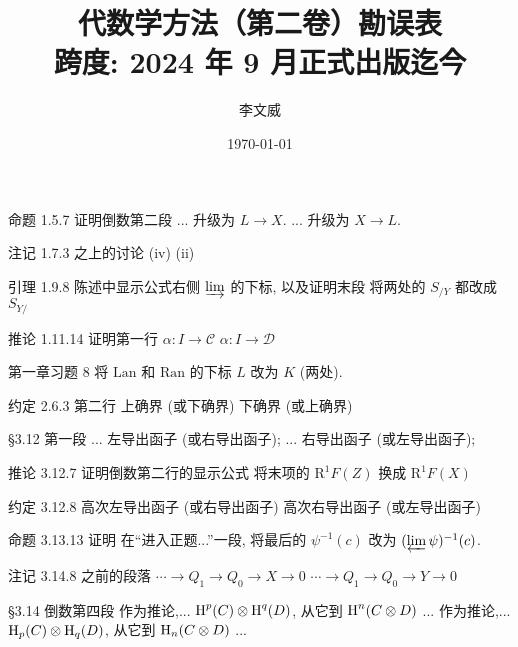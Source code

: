 \documentclass{AJerrata}
\title{\bfseries 代数学方法（第二卷）勘误表 \\ 跨度: 2024 年 9 月正式出版迄今 }
\author{李文威}
\date{\today}
\begin{document}
	\maketitle

	\begin{Errata}
		\item[命题 1.5.7 证明倒数第二段]
		\Orig ... 升级为 $L \to X$.
		\Corr ... 升级为 $X \to L$.
		
		\item[注记 1.7.3 之上的讨论]
		\Orig (iv)
		\Corr (ii)
		
		\item[引理 1.9.8 陈述中显示公式右侧 $\varinjlim$ 的下标, 以及证明末段]
		将两处的 $S_{/Y}$ 都改成 $S_{Y/}$
		
		\item[推论 1.11.14 证明第一行]
		\Orig $\alpha: I \to \mathcal{C}$
		\Corr $\alpha: I \to \mathcal{D}$
		
		\item[第一章习题 8]
		将 $\mathrm{Lan}$ 和 $\mathrm{Ran}$ 的下标 $L$ 改为 $K$ (两处).
		
		\item[约定 2.6.3 第二行]
		\Orig 上确界 (或下确界)
		\Corr 下确界 (或上确界)
		
		\item[\S 3.12 第一段]
		\Orig ... 左导出函子 (或右导出函子);
		\Corr ... 右导出函子 (或左导出函子);
		
		\item[推论 3.12.7 证明倒数第二行的显示公式]
		将末项的 $\mathrm{R}^1 F(Z)$ 换成 $\mathrm{R}^1 F(X)$
		
		\item[约定 3.12.8]
		\Orig 高次左导出函子 (或右导出函子)
		\Corr 高次右导出函子 (或左导出函子)
		
		\item[命题 3.13.13 证明]
		在``进入正题...''一段, 将最后的 $\psi^{-1}(c)$ 改为 $(\varprojlim \psi)^{-1}(c)$.
		
		\item[注记 3.14.8 之前的段落]
		\Orig $\cdots \to Q_1 \to Q_0 \to X \to 0$
		\Corr $\cdots \to Q_1 \to Q_0 \to Y \to 0$
		
		\item[\S 3.14 倒数第四段]
		\Orig 作为推论,... $\operatorname{H}^p(C) \otimes \operatorname{H}^q(D)$, 从它到 $\operatorname{H}^n(C \otimes D)$ ...
		\Corr 作为推论,... $\operatorname{H}_p(C) \otimes \operatorname{H}_q(D)$, 从它到 $\operatorname{H}_n(C \otimes D)$ ...
		

\end{Errata}
\end{document}
